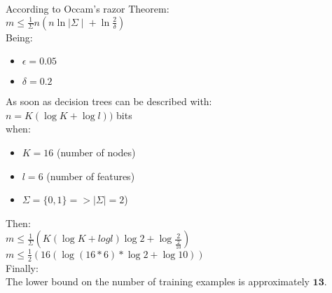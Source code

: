 According to Occam's razor Theorem:
\\
\bigbreak
$ m \leq \frac{1}{\Sigma} n (n\ln{\mid \Sigma \mid}+\ln{\frac{2}{\delta}})$
\\
\bigbreak
Being:
\begin{itemize}
	\item $\epsilon = 0.05$
	\item $\delta = 0.2$
\end{itemize}
As soon as decision trees can be described with:\\
$n = K(\log{K}+\log{l}))$ bits\\
\bigbreak
when:
\begin{itemize}
	\item $K = 16$ (number of nodes)
	\item $l = 6$ (number of features)
	\item $\Sigma = \{0,1\} => \mid \Sigma \mid = 2$)
\end{itemize}
Then:\\
\bigbreak
	$m \leq \frac{1}{\Sigma} (K(\log{K}+log{l})\log{2}+\log{\frac{2}{\frac{2}{10}}})$\\
	\bigbreak
	$ m \leq \frac{1}{2}(16(\log{(16*6)}*\log{2}+\log{10})) $\\
	\bigbreak
Finally:\\
The lower bound on the number of training examples is approximately $\textbf{13}$. 
